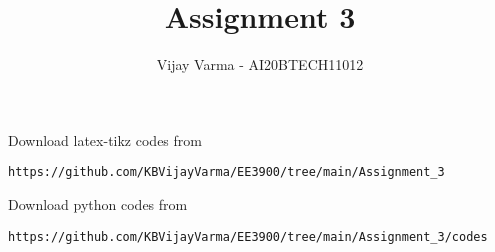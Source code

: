 \documentclass[journal,12pt,twocolumn]{IEEEtran}
\DeclareMathOperator*{\Res}{Res}
\begin{document}
\newcommand{\BEQA}{\begin{eqnarray}}
\newcommand{\EEQA}{\end{eqnarray}}
\newcommand{\define}{\stackrel{\triangle}{=}}

\raggedbottom
\setlength{\parindent}{0pt}
\providecommand{\mbf}{\mathbf}
\providecommand{\pr}[1]{\ensuremath{\Pr\left(#1\right)}}
\providecommand{\qfunc}[1]{\ensuremath{Q\left(#1\right)}}
\providecommand{\sbrak}[1]{\ensuremath{{}\left[#1\right]}}
\providecommand{\lsbrak}[1]{\ensuremath{{}\left[#1\right.}}
\providecommand{\rsbrak}[1]{\ensuremath{{}\left.#1\right]}}
\providecommand{\brak}[1]{\ensuremath{\left(#1\right)}}
\providecommand{\lbrak}[1]{\ensuremath{\left(#1\right.}}
\providecommand{\rbrak}[1]{\ensuremath{\left.#1\right)}}
\providecommand{\cbrak}[1]{\ensuremath{\left\{#1\right\}}}
\providecommand{\lcbrak}[1]{\ensuremath{\left\{#1\right.}}
\providecommand{\rcbrak}[1]{\ensuremath{\left.#1\right\}}}
\theoremstyle{remark}
\newtheorem{rem}{Remark}
\newcommand{\sgn}{\mathop{\mathrm{sgn}}}
\providecommand{\abs}[1]{\vert#1\vert}
\providecommand{\res}[1]{\Res\displaylimits_{#1}} 
\providecommand{\norm}[1]{\lVert#1\rVert}
\providecommand{\mtx}[1]{\mathbf{#1}}
\providecommand{\mean}[1]{E[ #1 ]}
\providecommand{\fourier}{\overset{\mathcal{F}}{ \rightleftharpoons}}
\providecommand{\system}{\overset{\mathcal{H}}{ \longleftrightarrow}}
\newcommand{\solution}{\noindent \textbf{Solution: }}
\newcommand{\cosec}{\,\text{cosec}\,}
\providecommand{\dec}[2]{\ensuremath{\overset{#1}{\underset{#2}{\gtrless}}}}
\newcommand{\myvec}[1]{\ensuremath{\begin{pmatrix}#1\end{pmatrix}}}
\newcommand{\mydet}[1]{\ensuremath{\begin{vmatrix}#1\end{vmatrix}}}
\makeatletter
{}
\makeatother
\let\StandardTheFigure\thefigure
\let\vec\mathbf
\renewcommand{\thefigure}{\theproblem}
\def\putbox#1#2#3{\makebox[0in][l]{\makebox[#1][l]{}\raisebox{\baselineskip}[0in][0in]{\raisebox{#2}[0in][0in]{#3}}}}
     \def\rightbox#1{\makebox[0in][r]{#1}}
     \def\centbox#1{\makebox[0in]{#1}}
     \def\topbox#1{\raisebox{-\baselineskip}[0in][0in]{#1}}
     \def\midbox#1{\raisebox{-0.5\baselineskip}[0in][0in]{#1}}
\vspace{3cm}
\title{Assignment 3}
\author{Vijay Varma - AI20BTECH11012}
\maketitle
\newpage
\bigskip
\renewcommand{\thefigure}{\theenumi}
\renewcommand{\thetable}{\theenumi}
%
Download latex-tikz codes from 
%
\begin{lstlisting}
https://github.com/KBVijayVarma/EE3900/tree/main/Assignment_3
\end{lstlisting}
%
Download python codes from 
%
\begin{lstlisting}
https://github.com/KBVijayVarma/EE3900/tree/main/Assignment_3/codes
\end{lstlisting}
\end{document}
